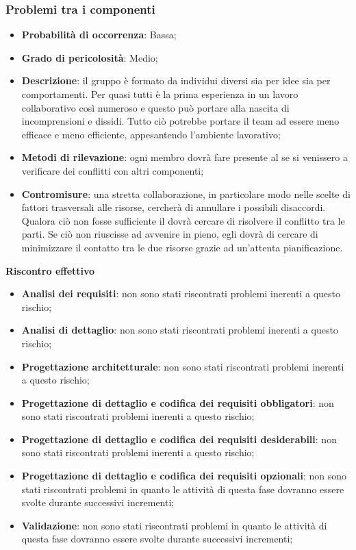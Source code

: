 		\subsubsection{Problemi tra i componenti} %
		\label{ssub:problemi_tra_i_componenti}
			\begin{itemize}
				\item \textbf{Probabilità di occorrenza}: Bassa;
				\item \textbf{Grado di pericolosità}: Medio;
				\item \textbf{Descrizione}: il gruppo è formato da individui diversi sia per idee sia per comportamenti. Per quasi tutti è la prima esperienza in un lavoro collaborativo così numeroso e questo può portare alla nascita di incomprensioni e dissidi. Tutto ciò potrebbe portare il team ad essere meno efficace e meno efficiente, appesantendo l'ambiente lavorativo;
				\item \textbf{Metodi di rilevazione}: ogni membro dovrà fare presente al \roleProjectManager{} se si venissero a verificare dei conflitti con altri componenti;
				\item \textbf{Contromisure}: una stretta collaborazione, in particolare modo nelle scelte di fattori trasversali alle risorse, cercherà di annullare i possibili disaccordi. \newline
				Qualora ciò non fosse sufficiente il \roleProjectManager{} dovrà cercare di risolvere il conflitto tra le parti. Se ciò non riuscisse ad avvenire in pieno, egli dovrà di cercare di minimizzare il contatto tra le due risorse grazie ad un'attenta pianificazione. \newline
			\end{itemize}
		\noindent
		\textbf{Riscontro effettivo}
			\begin{itemize}
				\item \textbf{Analisi dei requisiti}: non sono stati riscontrati problemi inerenti a questo rischio;
				\item \textbf{Analisi di dettaglio}: non sono stati riscontrati problemi inerenti a questo rischio;
				\item \textbf{Progettazione architetturale}: non sono stati riscontrati problemi inerenti a questo rischio;
				\item \textbf{Progettazione di dettaglio e codifica dei requisiti obbligatori}: non sono stati riscontrati problemi inerenti a questo rischio;
				\item \textbf{Progettazione di dettaglio e codifica dei requisiti desiderabili}: non sono stati riscontrati problemi inerenti a questo rischio;
				\item \textbf{Progettazione di dettaglio e codifica dei requisiti opzionali}: non sono stati riscontrati problemi in quanto le attività di questa fase dovranno essere svolte durante successivi incrementi;
				\item \textbf{Validazione}: non sono stati riscontrati problemi in quanto le attività di questa fase dovranno essere svolte durante successivi incrementi;
			\end{itemize}

